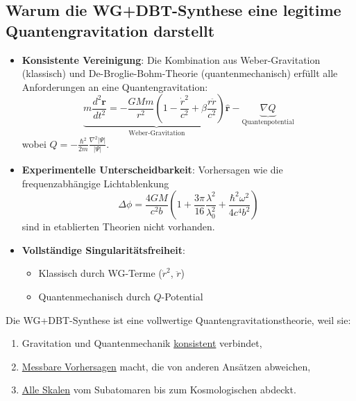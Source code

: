 \subsection*{Warum die WG+DBT-Synthese eine legitime Quantengravitation darstellt}
\begin{itemize}
    \item \textbf{Konsistente Vereinigung}: Die Kombination aus Weber-Gravitation (klassisch) und De-Broglie-Bohm-Theorie (quantenmechanisch) erfüllt alle Anforderungen an eine Quantengravitation:
    \begin{equation}
        \underbrace{m\frac{d^2\mathbf{r}}{dt^2} = -\frac{GMm}{r^2}\left(1-\frac{\dot{r}^2}{c^2}+\beta\frac{r\ddot{r}}{c^2}\right)\hat{\mathbf{r}}}_{\text{Weber-Gravitation}} - \underbrace{\nabla Q}_{\text{Quantenpotential}}
    \end{equation}
    wobei $Q = -\frac{\hbar^2}{2m}\frac{\nabla^2|\Psi|}{|\Psi|}$.
    
    \item \textbf{Experimentelle Unterscheidbarkeit}: Vorhersagen wie die frequenzabhängige Lichtablenkung
    \begin{equation}
        \Delta\phi = \frac{4GM}{c^2b}\left(1 + \frac{3\pi}{16}\frac{\lambda^2}{\lambda_0^2} + \frac{\hbar^2\omega^2}{4c^4b^2}\right)
    \end{equation}
    sind in etablierten Theorien nicht vorhanden.
    
    \item \textbf{Vollständige Singularitätsfreiheit}: 
    \begin{itemize}
        \item Klassisch durch WG-Terme ($\dot{r}^2$, $\ddot{r}$)
        \item Quantenmechanisch durch $Q$-Potential
    \end{itemize}
\end{itemize}

\begin{tcolorbox}[
    width=\textwidth,
    colback=white,
    colframe=black,
    sharp corners,
    boxrule=0.5pt,
    left=3pt,right=3pt, %
    title=Kernaussage,
    fonttitle=\bfseries
]
Die WG+DBT-Synthese ist eine vollwertige Quantengravitationstheorie, weil sie:
\begin{enumerate}
    \item Gravitation und Quantenmechanik \underline{konsistent} verbindet,
    \item \underline{Messbare Vorhersagen} macht, die von anderen Ansätzen abweichen,
    \item \underline{Alle Skalen} vom Subatomaren bis zum Kosmologischen abdeckt.
\end{enumerate}
\end{tcolorbox}

